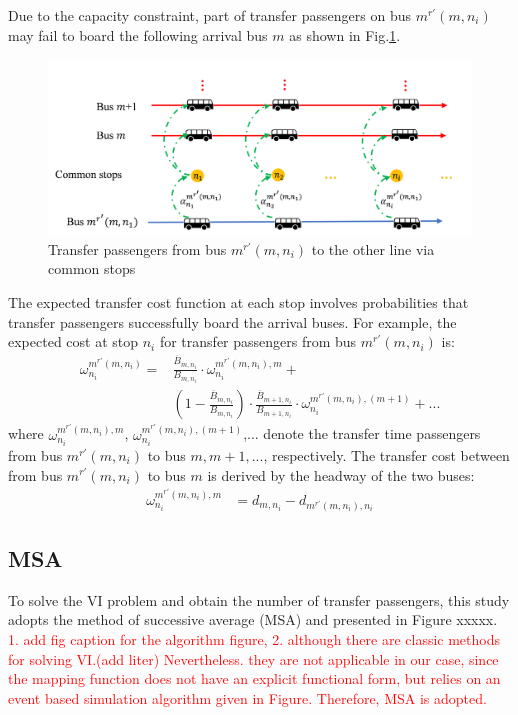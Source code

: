 \documentclass[smallextended]{svjour3}       %
\begin{document}
\begin{Abstract}
Due to the capacity constraint, part of transfer passengers on bus $m^{r'}(m,n_{i})$ may fail to board the following arrival bus $m$
as shown in Fig.\ref{fig:trans in common stop}.
\begin{figure}[H]
    \centering
    \includegraphics[width=1\linewidth]{CASPT2021paper_fig/trans in common stop.png}
    \caption{Transfer passengers from bus $m^{r'}(m,n_{i})$ to the other line via common stops}
    \label{fig:trans in common stop}
\end{figure}

The expected transfer cost function at each stop involves probabilities that transfer passengers successfully board the arrival buses.
For example, the expected cost at stop $n_{i}$ for transfer passengers from bus $m^{r'}(m,n_{i})$ is:
\begin{equation}
    \label{equ:omega}
    \begin{split}
        \omega_{n_i}^{m^{r'}(m,n_{i})} = &\frac{\overline{B}_{m,n_{i}}}{B_{m,n_{i}}}\cdot \omega_{n_i}^{m^{r'}(m,n_{i}),m} +\\
        &\left(1-\frac{\overline{B}_{m,n_{i}}}{B_{m,n_{i}}}\right)\cdot \frac{\overline{B}_{m+1,n_{i}}}{B_{m+1,n_{i}}}\cdot \omega_{n_i}^{m^{r'}(m,n_{i}),(m+1)}
        + ...        
    \end{split}
\end{equation}
where $\omega_{n_i}^{m^{r'}(m,n_{i}),m}$, $\omega_{n_i}^{m^{r'}(m,n_{i}),(m+1)}$,... 
denote the transfer time passengers from bus $m^{r'}(m,n_{i})$ to bus $m,m+1,...$, respectively.
The transfer cost between from bus $m^{r'}(m,n_{i})$ to bus $m$ is derived by the headway of the two buses:
\begin{equation}
    \begin{split}
        \omega_{n_{i}}^{m^{r'}(m,n_{i}),m}&=d_{m,n_{i}}-d_{m^{r'}(m,n_{i}),n_{i}}
    \end{split}
\end{equation}

\subsection{MSA}\label{algorithms}
To solve the VI problem and obtain the number of transfer passengers, this study adopts the method of successive average (MSA) and presented in Figure xxxxx. 
\textcolor{red}{
    1. add fig caption for the algorithm figure,
    2. although there are classic methods for solving VI.(add liter)  Nevertheless. they are not applicable in our case, since the mapping function does not have an explicit functional form, but relies on an event based simulation algorithm given in Figure. Therefore, MSA is adopted. 
}
  

\end{Abstract}
\end{document}

